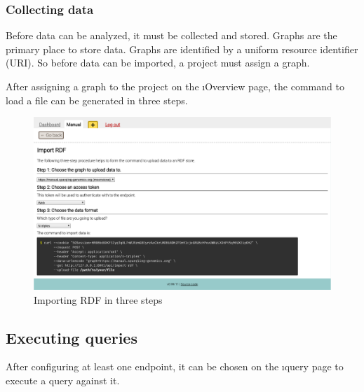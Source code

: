 \subsubsection{Collecting data}

  Before data can be analyzed, it must be collected and stored.  Graphs are
  the primary place to store data.  Graphs are identified by a uniform resource
  identifier (URI).  So before data can be imported, a project must assign a
  graph.

  After assigning a graph to the project on the \i{Overview} page, the
  command to load a file can be generated in three steps.

  \begin{figure}[H]
    \begin{center}
      \includegraphics[width=1.0\textwidth]{figures/sg-web-import-rdf.pdf}
    \end{center}
    \caption{Importing RDF in three steps}
    \label{fig:web-import-rdf}
  \end{figure}

\subsection{Executing queries}

  After configuring at least one endpoint, it can be chosen on the \i{query}
  page to execute a query against it.

